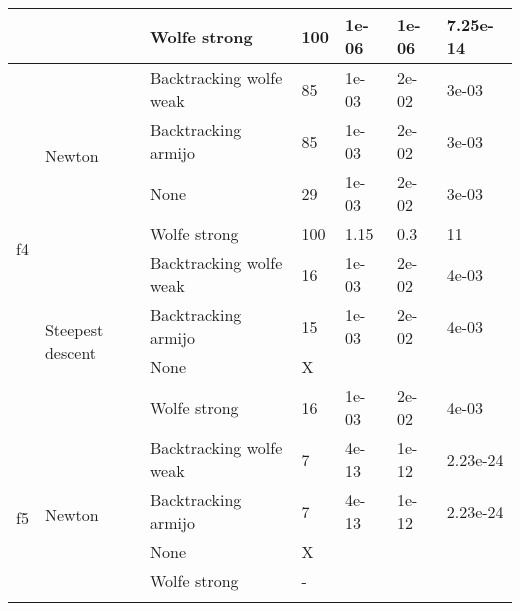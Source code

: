 \documentclass[a4paper,11pt]{article}
\numberwithin{equation}{section} %
\begin{document}
\begin{table}[h!]
\begin{tabular}{|c|l|l|l|l|l|l|}
                                &                                   & Wolfe strong            & 100        & 1e-06    & 1e-06     & 7.25e-14     \\ \hline
\multirow{8}{*}{f4}             & \multirow{4}{*}{Newton}           & Backtracking wolfe weak & 85         & 1e-03    & 2e-02     & 3e-03        \\ \cline{3-7} 
                                &                                   & Backtracking armijo     & 85         & 1e-03    & 2e-02     & 3e-03        \\ \cline{3-7} 
                                &                                   & None                    & 29         & 1e-03    & 2e-02     & 3e-03        \\ \cline{3-7} 
                                &                                   & Wolfe strong            & 100        & 1.15     & 0.3       & 11           \\ \cline{2-7} 
                                & \multirow{4}{*}{Steepest descent} & Backtracking wolfe weak & 16         & 1e-03    & 2e-02     & 4e-03        \\ \cline{3-7} 
                                &                                   & Backtracking armijo     & 15         & 1e-03    & 2e-02     & 4e-03        \\ \cline{3-7} 
                                &                                   & None                    & X          &          &           &              \\ \cline{3-7} 
                                &                                   & Wolfe strong            & 16         & 1e-03    & 2e-02     & 4e-03        \\ \hline
\multirow{8}{*}{f5}             & \multirow{4}{*}{Newton}           & Backtracking wolfe weak & 7          & 4e-13    & 1e-12     & 2.23e-24     \\ \cline{3-7} 
                                &                                   & Backtracking armijo     & 7          & 4e-13    & 1e-12     & 2.23e-24     \\ \cline{3-7} 
                                &                                   & None                    & X          &          &           &              \\ \cline{3-7} 
                                &                                   & Wolfe strong            & -          &          &           &              \\ \cline{2-7} 

\end{tabular}
\end{table}
\end{document}
